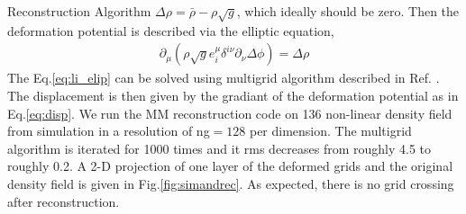\begin{section}{Reconstruction Algorithm}
$\Delta \rho = \bar{\rho}-\rho \sqrt{g}$, which ideally should be zero. Then the 
deformation potential is described via the elliptic equation,
\begin{align}
 \label{eq:li_elip}
    \partial _\mu (\rho \sqrt{g} e^\mu _i \delta^{i\nu}\partial_\nu \Delta \phi)=\Delta \rho
\end{align}
The Eq.\ref{eq:li_elip} can be solved using multigrid algorithm described in Ref. 
\cite{bib:Pen1995,bib:Pen1998}. The displacement is then given by the gradiant of the deformation 
potential as in Eq.\ref{eq:disp}. We run the MM reconstruction code on 136 non-linear density field from simulation 
in a resolution of ng$=128$ per dimension. The multigrid algorithm is iterated for 1000 times and it rms 
decreases from roughly 4.5 to roughly 0.2. 
A 2-D projection of one layer of the deformed grids and the 
original density field is given in Fig.\ref{fig:simandrec}. 
As expected, there is no grid crossing after reconstruction.
%
\end{section}

